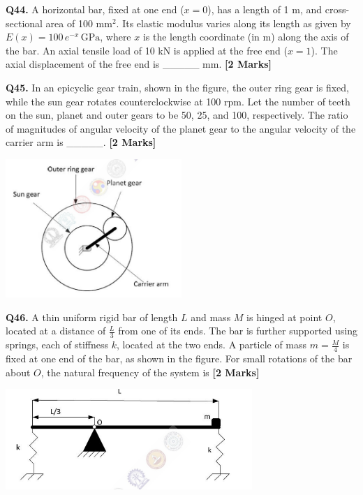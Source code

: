 \documentclass[11pt]{article}
\newcommand{\questionb}[2]{
    \noindent\textbf{Q#2.} #1 \hfill \textbf{[2 Marks]}
}
\begin{document}
\questionb{A horizontal bar, fixed at one end (\( x = 0 \)), has a length of 1 m, and cross-sectional area of 100 mm\(^2\). Its elastic modulus varies along its length as given by \( E(x) = 100 \, e^{-x} \, \text{GPa} \), where \( x \) is the length coordinate (in m) along the axis of the bar. An axial tensile load of 10 kN is applied at the free end (\( x = 1 \)). The axial displacement of the free end is \_\_\_\_\_ mm.}{44}
\vspace{0.5cm}

\questionb{In an epicyclic gear train, shown in the figure, the outer ring gear is fixed, while the sun gear rotates counterclockwise at 100 rpm. Let the number of teeth on the sun, planet and outer gears to be 50, 25, and 100, respectively. The ratio of magnitudes of angular velocity of the planet gear to the angular velocity of the carrier arm is \_\_\_\_\_.}{45}
\begin{center}
\includegraphics[width=0.5\textwidth]{figures/45.png}
\end{center}
\vspace{0.5cm}

\questionb{A thin uniform rigid bar of length \( L \) and mass \( M \) is hinged at point \( O \), located at a distance of \(\frac{L}{3}\) from one of its ends. The bar is further supported using springs, each of stiffness \( k \), located at the two ends. A particle of mass \( m = \frac{M}{4} \) is fixed at one end of the bar, as shown in the figure. For small rotations of the bar about \( O \), the natural frequency of the system is}{46}
\begin{center}
\includegraphics[width=0.7\textwidth]{figures/46.png}
\end{center}
\vspace{0.5cm}
\end{document}
